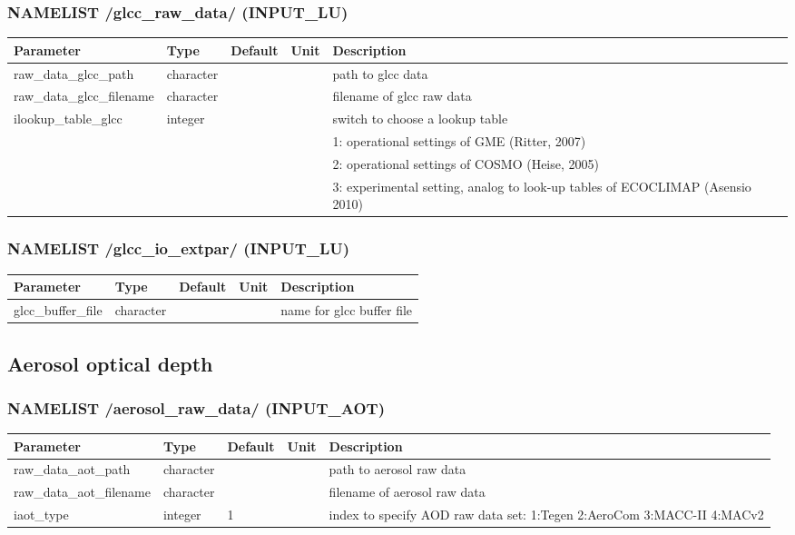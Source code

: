 \documentclass[a4paper,10pt,DIV14,BCOR1cm,titlepage,twoside]{scrartcl}
\providecommand{\tabularnewline}{\\}
\begin{document}
\subsubsection*{NAMELIST /glcc\_raw\_data/ (INPUT\_LU)}

\begin{longtable}{|p{4cm}|p{1.5cm}|p{1.5cm}|p{1cm}|p{6cm}|}
\hline 
\textbf{Parameter}& \textbf{Type}&\textbf{Default}& \textbf{Unit}& \textbf{Description}
\tabularnewline
\hline
\endhead
\hline 
raw\_data\_glcc\_path & character & &  & path to glcc data \tabularnewline
\hline 
raw\_data\_glcc\_filename & character & &  & filename of glcc raw data \tabularnewline
\hline
ilookup\_table\_glcc & integer & & &  switch to choose a lookup table
\tabularnewline
 & & & & 1: operational settings of GME (Ritter, 2007)\tabularnewline
 & & & & 2: operational settings of COSMO (Heise, 2005)\tabularnewline
 & & & & 3: experimental setting, analog to look-up tables of ECOCLIMAP (Asensio 2010)\tabularnewline
\hline
\bottomrule
\end{longtable}

\subsubsection*{NAMELIST /glcc\_io\_extpar/ (INPUT\_LU)}
\begin{longtable}{|p{4cm}|p{1.5cm}|p{1.5cm}|p{1cm}|p{6cm}|}
\hline 
\textbf{Parameter}& \textbf{Type}& \textbf{Default}& \textbf{Unit}& \textbf{Description}
\tabularnewline
\hline
\endhead
\hline
glcc\_buffer\_file & character & &  & name for glcc buffer file
\tabularnewline
\bottomrule
\end{longtable}

\subsection{Aerosol optical depth}\label{namelist_input_for_extpar_aot}

\subsubsection*{NAMELIST /aerosol\_raw\_data/ (INPUT\_AOT)}

\begin{longtable}{|p{4cm}|p{1.5cm}|p{1.5cm}|p{1cm}|p{6cm}|}
\hline 
\textbf{Parameter}& \textbf{Type}& \textbf{Default}& \textbf{Unit}& \textbf{Description}
\tabularnewline
\hline
\endhead
\hline 
raw\_data\_aot\_path & character & &  & path to aerosol raw data \tabularnewline
\hline 
raw\_data\_aot\_filename & character & &  & filename of aerosol raw data \tabularnewline
\hline 
iaot\_type & integer &1 &  & index to specify AOD raw data set: 1:Tegen 2:AeroCom 3:MACC-II 4:MACv2 \tabularnewline
\hline
\bottomrule
\end{longtable}
\end{document}
